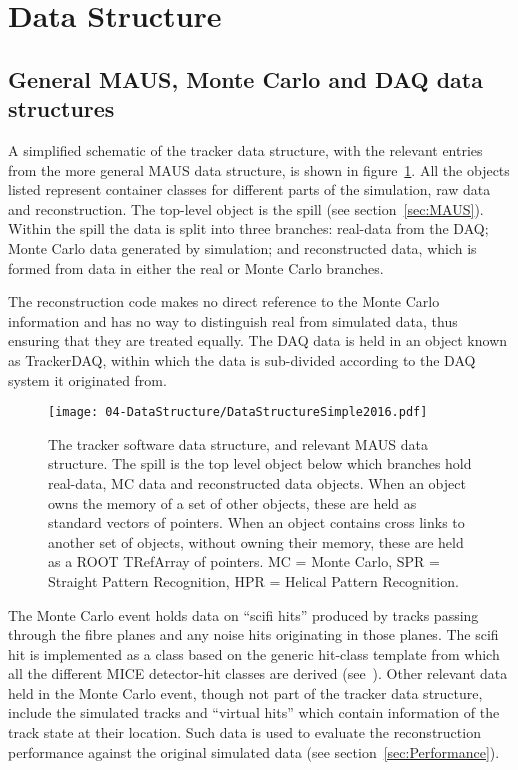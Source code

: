 \section{Data Structure}
\label{sec:DataStructure}

\subsection{General MAUS, Monte Carlo and DAQ data structures}
\label{subsec:GeneralDataStructure}
A simplified schematic of the tracker data structure, with the relevant entries from the more general MAUS data structure, is shown in figure~\ref{figureDataStructure}.  All the objects listed represent container classes for different parts of the simulation, raw data and reconstruction.  The top-level object is the spill (see section~\ref{sec:MAUS}).  Within the spill the data is split into three branches: real-data from the DAQ; Monte Carlo data generated by simulation; and reconstructed data, which is formed from data in either the real or Monte Carlo branches. 

The reconstruction code makes no direct reference to the Monte Carlo information and has no way to distinguish real from simulated data, thus ensuring that they are treated equally.  The DAQ data is held in an object known as TrackerDAQ, within which the data is sub-divided according to the DAQ system it originated from.%

\begin{figure}[bt]
  \begin{center}
    \texttt{[image: 04-DataStructure/DataStructureSimple2016.pdf]}
    \caption{\label{figureDataStructure}The tracker software data structure, and relevant MAUS data structure.  The spill is the top level object below which branches hold real-data, MC data and reconstructed data objects. When an object owns the memory of a set of other objects, these are held as standard vectors of pointers. When an object contains cross links to another set of objects, without owning their memory, these are held as a ROOT TRefArray of pointers. MC = Monte Carlo, SPR = Straight Pattern Recognition, HPR = Helical Pattern Recognition.}
  \end{center}
\end{figure}

The Monte Carlo event holds data on ``scifi hits'' produced by tracks passing through the fibre planes and any noise hits originating in those planes. The scifi hit is implemented as a class based on the generic hit-class template from which all the different MICE detector-hit classes are derived (see~\cite{MausIPAC11}).  Other relevant data held in the Monte Carlo event, though not part of the tracker data structure, include the simulated tracks and ``virtual hits'' which contain information of the track state at their location. Such data is used to evaluate the reconstruction performance against the original simulated data (see section~\ref{sec:Performance}).

